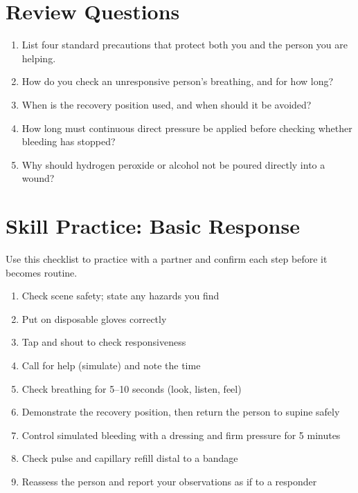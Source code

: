\section{Review Questions}

\begin{enumerate}[leftmargin=*]
\item List four standard precautions that protect both you and the person you are helping.
\item How do you check an unresponsive person's breathing, and for how long?
\item When is the recovery position used, and when should it be avoided?
\item How long must continuous direct pressure be applied before checking whether bleeding has stopped?
\item Why should hydrogen peroxide or alcohol not be poured directly into a wound?
\end{enumerate}
\section{Skill Practice: Basic Response}

Use this checklist to practice with a partner and confirm each step before it becomes routine.

\begin{enumerate}[leftmargin=*]
\item Check scene safety; state any hazards you find
\item Put on disposable gloves correctly
\item Tap and shout to check responsiveness
\item Call for help (simulate) and note the time
\item Check breathing for 5--10 seconds (look, listen, feel)
\item Demonstrate the recovery position, then return the person to supine safely
\item Control simulated bleeding with a dressing and firm pressure for 5 minutes
\item Check pulse and capillary refill distal to a bandage
\item Reassess the person and report your observations as if to a responder
\end{enumerate}
